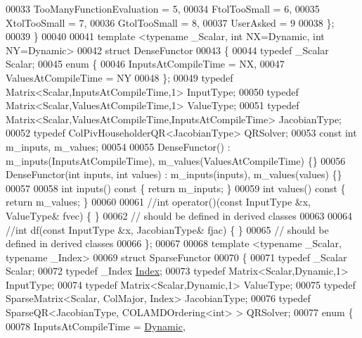\begin{DoxyCode}
00033         TooManyFunctionEvaluation = 5,
00034         FtolTooSmall = 6,
00035         XtolTooSmall = 7,
00036         GtolTooSmall = 8,
00037         UserAsked = 9
00038     \};
00039 \}
00040 
00041 \textcolor{keyword}{template} <\textcolor{keyword}{typename} \_Scalar, \textcolor{keywordtype}{int} NX=Dynamic, \textcolor{keywordtype}{int} NY=Dynamic>
00042 \textcolor{keyword}{struct }DenseFunctor
00043 \{
00044   \textcolor{keyword}{typedef} \_Scalar Scalar;
00045   \textcolor{keyword}{enum} \{
00046     InputsAtCompileTime = NX,
00047     ValuesAtCompileTime = NY
00048   \};
00049   \textcolor{keyword}{typedef} Matrix<Scalar,InputsAtCompileTime,1> InputType;
00050   \textcolor{keyword}{typedef} Matrix<Scalar,ValuesAtCompileTime,1> ValueType;
00051   \textcolor{keyword}{typedef} Matrix<Scalar,ValuesAtCompileTime,InputsAtCompileTime> JacobianType;
00052   \textcolor{keyword}{typedef} ColPivHouseholderQR<JacobianType> QRSolver;
00053   \textcolor{keyword}{const} \textcolor{keywordtype}{int} m\_inputs, m\_values;
00054 
00055   DenseFunctor() : m\_inputs(InputsAtCompileTime), m\_values(ValuesAtCompileTime) \{\}
00056   DenseFunctor(\textcolor{keywordtype}{int} inputs, \textcolor{keywordtype}{int} values) : m\_inputs(inputs), m\_values(values) \{\}
00057 
00058   \textcolor{keywordtype}{int} inputs()\textcolor{keyword}{ const }\{ \textcolor{keywordflow}{return} m\_inputs; \}
00059   \textcolor{keywordtype}{int} values()\textcolor{keyword}{ const }\{ \textcolor{keywordflow}{return} m\_values; \}
00060 
00061   \textcolor{comment}{//int operator()(const InputType &x, ValueType& fvec) \{ \}}
00062   \textcolor{comment}{// should be defined in derived classes}
00063   
00064   \textcolor{comment}{//int df(const InputType &x, JacobianType& fjac) \{ \}}
00065   \textcolor{comment}{// should be defined in derived classes}
00066 \};
00067 
00068 \textcolor{keyword}{template} <\textcolor{keyword}{typename} \_Scalar, \textcolor{keyword}{typename} \_Index>
00069 \textcolor{keyword}{struct }SparseFunctor
00070 \{
00071   \textcolor{keyword}{typedef} \_Scalar Scalar;
00072   \textcolor{keyword}{typedef} \_Index \hyperlink{namespace_eigen_a62e77e0933482dafde8fe197d9a2cfde}{Index};
00073   \textcolor{keyword}{typedef} Matrix<Scalar,Dynamic,1> InputType;
00074   \textcolor{keyword}{typedef} Matrix<Scalar,Dynamic,1> ValueType;
00075   \textcolor{keyword}{typedef} SparseMatrix<Scalar, ColMajor, Index> JacobianType;
00076   \textcolor{keyword}{typedef} SparseQR<JacobianType, COLAMDOrdering<int> > QRSolver;
00077   \textcolor{keyword}{enum} \{
00078     InputsAtCompileTime = \hyperlink{namespace_eigen_ad81fa7195215a0ce30017dfac309f0b2}{Dynamic},

\end{DoxyCode}
